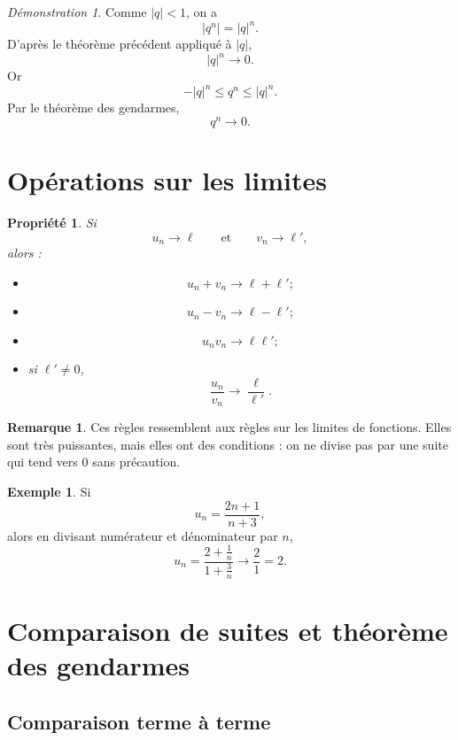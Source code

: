 \documentclass[11pt,a4paper]{article}
\theoremstyle{definition}
\newtheorem{exemple}[definition]{Exemple}
\newtheorem{remarque}[definition]{Remarque}
\theoremstyle{plain}
\newtheorem{propriete}[definition]{Propriété}
\theoremstyle{remark}
\newtheorem*{demonstrationlibre}{Démonstration}
\begin{document}
\begin{demonstrationlibre}
Comme $|q|<1$, on a
\[
|q^n|=|q|^n.
\]
D'après le théorème précédent appliqué à $|q|$,
\[
|q|^n\to0.
\]
Or
\[
-|q|^n\leq q^n\leq |q|^n.
\]
Par le théorème des gendarmes,
\[
q^n\to0.
\]
\end{demonstrationlibre}

\section{Opérations sur les limites}

\begin{propriete}
Si
\[
u_n\to \ell
\qquad \text{et} \qquad
v_n\to \ell',
\]
alors :
\begin{itemize}[leftmargin=0.8cm]
    \item
    \[
    u_n+v_n\to \ell+\ell' ;
    \]
    \item
    \[
    u_n-v_n\to \ell-\ell' ;
    \]
    \item
    \[
    u_nv_n\to \ell\ell' ;
    \]
    \item si $\ell'\neq0$,
    \[
    \frac{u_n}{v_n}\to \frac{\ell}{\ell'}.
    \]
\end{itemize}
\end{propriete}

\begin{remarque}
Ces règles ressemblent aux règles sur les limites de fonctions. Elles sont très puissantes, mais elles ont des conditions : on ne divise pas par une suite qui tend vers $0$ sans précaution.
\end{remarque}

\begin{exemple}
Si
\[
u_n=\frac{2n+1}{n+3},
\]
alors en divisant numérateur et dénominateur par $n$,
\[
u_n=\frac{2+\frac1n}{1+\frac3n}\longrightarrow \frac21=2.
\]
\end{exemple}

\section{Comparaison de suites et théorème des gendarmes}

\subsection{Comparaison terme à terme}
\end{document}

